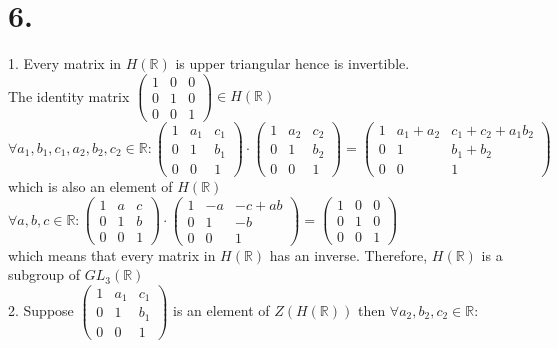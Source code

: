 \documentclass[11pt]{article}
\begin{document}
\section*{6.}
1. 
Every matrix in $H(\mathbb{R})$ is upper triangular hence is invertible.\\
The identity matrix $\begin{pmatrix}
1 & 0 & 0 \\
0 & 1 & 0 \\
0 & 0 & 1
\end{pmatrix} \in H(\mathbb{R})$ \\
$\forall a_1, b_1, c_1, a_2, b_2, c_2 \in \mathbb{R}:
\begin{pmatrix}
1 & a_1 & c_1 \\
0 & 1 & b_1 \\
0 & 0 & 1
\end{pmatrix} \cdot 
\begin{pmatrix}
1 & a_2 & c_2 \\
0 & 1 & b_2 \\
0 & 0 & 1
\end{pmatrix} 
=
\begin{pmatrix}
1 & a_1 + a_2 & c_1 + c_2 + a_1b_2 \\
0 & 1 & b_1 + b_2 \\
0 & 0 & 1
\end{pmatrix}$ which is also an element of $H(\mathbb{R})$ \\
$\forall a,b,c \in \mathbb{R}: 
\begin{pmatrix}
1 & a & c \\
0 & 1 & b \\
0 & 0 & 1
\end{pmatrix} \cdot 
\begin{pmatrix}
1 & -a & -c+ab \\
0 & 1 & -b \\
0 & 0 & 1
\end{pmatrix} 
= \begin{pmatrix}
1 & 0 & 0 \\
0 & 1 & 0 \\
0 & 0 & 1
\end{pmatrix}$ \\
which means that every matrix in $H(\mathbb{R})$ has an inverse.
Therefore, $H(\mathbb{R})$ is a subgroup of $GL_3(\mathbb{R})$ \\
2. Suppose $\begin{pmatrix}
1 & a_1 & c_1 \\
0 & 1 & b_1 \\
0 & 0 & 1
\end{pmatrix}$ is an element of $Z(H(\mathbb{R}))$ then $\forall a_2,b_2,c_2 \in \mathbb{R}:$ 
\end{document}
